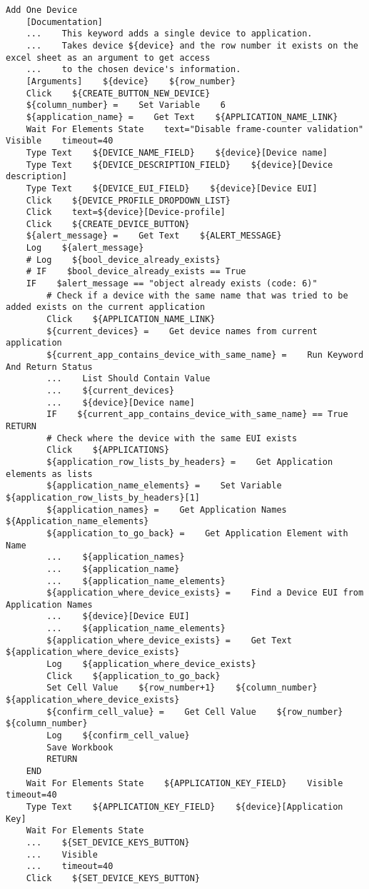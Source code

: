 \begin{verbatim}
Add One Device
    [Documentation]
    ...    This keyword adds a single device to application.
    ...    Takes device ${device} and the row number it exists on the excel sheet as an argument to get access
    ...    to the chosen device's information.
    [Arguments]    ${device}    ${row_number}
    Click    ${CREATE_BUTTON_NEW_DEVICE}
    ${column_number} =    Set Variable    6
    ${application_name} =    Get Text    ${APPLICATION_NAME_LINK}
    Wait For Elements State    text="Disable frame-counter validation"    Visible    timeout=40
    Type Text    ${DEVICE_NAME_FIELD}    ${device}[Device name]
    Type Text    ${DEVICE_DESCRIPTION_FIELD}    ${device}[Device description]
    Type Text    ${DEVICE_EUI_FIELD}    ${device}[Device EUI]
    Click    ${DEVICE_PROFILE_DROPDOWN_LIST}
    Click    text=${device}[Device-profile]
    Click    ${CREATE_DEVICE_BUTTON}
    ${alert_message} =    Get Text    ${ALERT_MESSAGE}
    Log    ${alert_message}
    # Log    ${bool_device_already_exists}
    # IF    $bool_device_already_exists == True
    IF    $alert_message == "object already exists (code: 6)"
        # Check if a device with the same name that was tried to be added exists on the current application
        Click    ${APPLICATION_NAME_LINK}
        ${current_devices} =    Get device names from current application
        ${current_app_contains_device_with_same_name} =    Run Keyword And Return Status
        ...    List Should Contain Value
        ...    ${current_devices}
        ...    ${device}[Device name]
        IF    ${current_app_contains_device_with_same_name} == True    RETURN
        # Check where the device with the same EUI exists
        Click    ${APPLICATIONS}
        ${application_row_lists_by_headers} =    Get Application elements as lists
        ${application_name_elements} =    Set Variable    ${application_row_lists_by_headers}[1]
        ${application_names} =    Get Application Names    ${Application_name_elements}
        ${application_to_go_back} =    Get Application Element with Name
        ...    ${application_names}
        ...    ${application_name}
        ...    ${application_name_elements}
        ${application_where_device_exists} =    Find a Device EUI from Application Names
        ...    ${device}[Device EUI]
        ...    ${application_name_elements}
        ${application_where_device_exists} =    Get Text    ${application_where_device_exists}
        Log    ${application_where_device_exists}
        Click    ${application_to_go_back}
        Set Cell Value    ${row_number+1}    ${column_number}    ${application_where_device_exists}
        ${confirm_cell_value} =    Get Cell Value    ${row_number}    ${column_number}
        Log    ${confirm_cell_value}
        Save Workbook
        RETURN
    END
    Wait For Elements State    ${APPLICATION_KEY_FIELD}    Visible    timeout=40
    Type Text    ${APPLICATION_KEY_FIELD}    ${device}[Application Key]
    Wait For Elements State
    ...    ${SET_DEVICE_KEYS_BUTTON}
    ...    Visible
    ...    timeout=40
    Click    ${SET_DEVICE_KEYS_BUTTON}


\end{verbatim}
